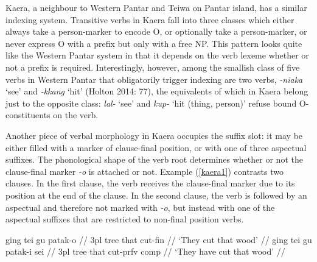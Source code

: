 Kaera, a neighbour to Western Pantar and Teiwa on Pantar island, has a similar indexing system. Transitive verbs in Kaera fall into three classes which either always take a person-marker to encode O, or optionally take a person-marker, or never express O with a prefix but only with a free NP. This pattern looks quite like the Western Pantar system in that it depends on the verb lexeme whether or not a prefix is required. Interestingly, however, among the smallish class of five verbs in Western Pantar that obligatorily trigger indexing are two verbs, \textit{-niaka} `see' and \textit{-kkang} `hit' (Holton 2014: 77), the equivalents of which in Kaera belong just to the opposite class: \textit{lal-} `see' and \textit{kup-} `hit (thing, person)' refuse bound O-constituents on the verb. 

Another piece of verbal morphology in Kaera occupies the suffix slot: it may be either filled with a marker of clause-final position, or with one of three aspectual suffixes. The phonological shape of the verb root determines whether or not the clause-final marker \textit{-o} is attached or not. Example (\ref{kaera1}) contrasts two clauses. In the first clause, the verb receives the clause-final marker due to its position at the end of the clause. In the second clause, the verb is followed by an aspectual and therefore not marked with \textit{-o}, but instead with one of the aspectual suffixes that are restricted to non-final position verbs.

\pex \label{kaera1}
\a
\begingl
\gla ging tei gu patak-o // 
\glb \acs{3}\acs{pl} tree that cut-\acs{fin} //
\glft `They cut that wood' // 
\endgl
\a
\begingl
\gla ging tei gu patak-i sei // 
\glb \acs{3}\acs{pl} tree that cut-\acs{prfv} \acs{comp} //
\glft `They have cut that wood' // 
\endgl
\xe

